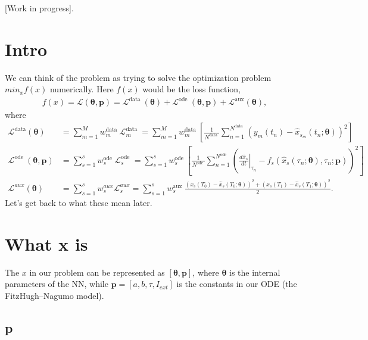 \documentclass[a4paper]{article}
\begin{document}
[Work in progress].

\section{Intro}

We can think of the problem as trying to solve the optimization problem $min_x f(x)$ numerically. Here $f(x)$ would be the loss function,
\begin{align}
	f(x) = \mathcal{L}(\boldsymbol{\theta}, \mathbf{p})=\mathcal{L}^{\text {data }}(\boldsymbol{\theta})+\mathcal{L}^{\text {ode }}(\boldsymbol{\theta}, \mathbf{p})+\mathcal{L}^{\operatorname{aux}}(\boldsymbol{\theta}), 
\end{align}
where
\begin{align}
\mathcal{L}^{ \text{data}}(\boldsymbol{\theta}) &= \sum_{m=1}^{M} w_{m}^{\text {data }} \mathcal{L}_{m}^{\text {data }}=\sum_{m=1}^{M} w_{m}^{\text {data }}\left[\frac{1}{N^{\text {data }}} \sum_{n=1}^{N^{\text {data }}}\left(y_{m}\left(t_{n}\right)-\hat{x}_{s_{m}}\left(t_{n} ; \boldsymbol{\theta}\right)\right)^{2}\right] \\
\mathcal{L}^{\text {ode }}(\boldsymbol{\theta}, \mathbf{p}) &= \sum_{s=1}^{s} w_{s}^{\text {ode }} \mathcal{L}_{s}^{\text {ode }}=\sum_{s=1}^{s} w_{s}^{\text {ode }}\left[\frac{1}{N^{\text {ode }}} \sum_{n=1}^{N^{\text {ode }}}\left(\left.\frac{d \hat{x}_{s}}{d t}\right|_{\tau_{n}}-f_{s}\left(\hat{x}_{s}\left(\tau_{n} ; \boldsymbol{\theta}\right), \tau_{n} ; \mathbf{p}\right)\right)^{2}\right] \\
\mathcal{L}^{a u x}(\boldsymbol{\theta}) &= \sum_{s=1}^{s} w_{s}^{a u x} \mathcal{L}_{s}^{a u x}=\sum_{s=1}^{s} w_{s}^{\text {aux }} \frac{\left(x_{s}\left(T_{0}\right)-\hat{x}_{s}\left(T_{0} ; \boldsymbol{\theta}\right)\right)^{2}+\left(x_{s}\left(T_{1}\right)-\hat{x}_{s}\left(T_{1} ; \boldsymbol{\theta}\right)\right)^{2}}{2}.
\end{align}
Let's get back to what these mean later.

\section{What x is}

The $x$ in our problem can be represented as $[\boldsymbol{\theta}, \mathbf{p}]$, where $\boldsymbol{\theta}$ is the internal parameters of the NN, while $\mathbf{p} = [a, b, \tau, I_{ext}]$ is the constants in our ODE (the FitzHugh–Nagumo model). 

\subsection{\textbf{p}}
\end{document}

